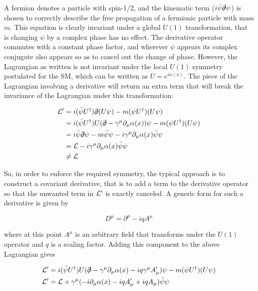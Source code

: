 \noindent A fermion denotes a particle with spin-1/2, and the kinematic term ($i\bar{\psi}\slashed{\partial}\psi$) is chosen to correctly describe the free propagation of a fermionic particle with mass $m$. 
This equation is clearly invariant under a global $U(1)$ transformation, that is changing $\psi$ by a complex phase has no effect. 
The derivative operator commutes with a constant phase factor, and wherever $\psi$ appears its complex conjugate also appears so as to cancel out the change of phase. 
However, the Lagrangian as written is not invariant under the local $U(1)$ symmetry postulated for the \ac{SM}, which can be written as $U = e^{i\alpha(x)}$. 
The piece of the Lagrangian involving a derivative will return an extra term that will break the invariance of the Lagrangian under this transformation:

\begin{align*}
 \mathcal{L}' &= i (\bar{\psi}U^\dagger)\slashed{\partial}(U\psi) - m(\psi U^\dagger)(U\psi) \\
      &= i (\bar{\psi}U^\dagger) U(\slashed{\partial} - \gamma^\mu \partial_\mu\alpha(x))\psi - m(\psi U^\dagger)(U\psi) \\
      &= i \bar{\psi}\slashed{\partial}\psi -m\bar{\psi}\psi - i\gamma^\mu \partial_\mu\alpha(x)\bar{\psi}\psi  \\
      &= \mathcal{L} -  i\gamma^\mu \partial_\mu\alpha(x)\bar{\psi}\psi \\
      &\neq \mathcal{L} 
\end{align*}

\noindent So, in order to enforce the required symmetry, the typical approach is to construct a covariant derivative, that is to add a term to the derivative operator so that the unwanted term in $\mathcal{L}'$ is exactly canceled. 
A generic form for such a derivative is given by

\[ D^\mu = \partial^{\mu} - iqA^\mu \]

\noindent where at this point $A^\mu$ is an arbitrary field that transforms under the $U(1)$ operator and $q$ is a scaling factor. Adding this component to the above Lagrangian gives

\begin{align}
 \mathcal{L}' &=  i (\bar{\psi}U^\dagger) U(\slashed{\partial} - \gamma^\mu \partial_\mu\alpha(x) - iq\gamma^\mu A'_{\mu})\psi - m(\psi U^\dagger)(U\psi) \\
 \mathcal{L}' &= \mathcal{L} +\gamma^\mu (- i\partial_\mu\alpha(x) - iqA'_{\mu} + iqA_\mu)\bar{\psi}\psi 
\end{align}

